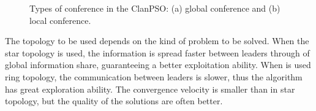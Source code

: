 \begin{figure}[!h]
\centering
{}
\hspace{1mm}
\caption{Types of conference in the ClanPSO: (a) global conference and (b) local conference.}
\label{fig:conference}
\end{figure}

The topology to be used depends on the kind of problem to be solved. When the star topology is used, the information is spread faster between leaders through of global information share, guaranteeing a better exploitation ability. When is used ring topology, the communication between leaders is slower, thus the algorithm has great exploration ability. The convergence velocity is smaller than in star topology, but the quality of the solutions are often better.

